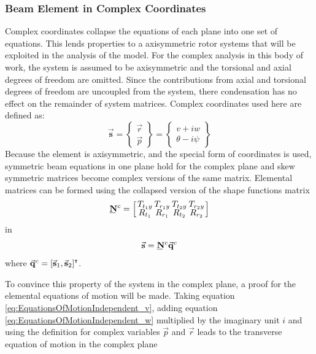 \subsubsection{Beam Element in Complex Coordinates} \label{Beam Element in Complex Coordinates}
Complex coordinates collapse the equations of each plane into one set of equations. This lends properties to a axisymmetric rotor systems that will be exploited in the analysis of the model. For the complex analysis in this body of work, the system is assumed to be axisymmetric and the torsional and axial degrees of freedom are omitted. Since the contributions from axial and torsional degrees of freedom are uncoupled from the system, there condensation has no effect on the remainder of system matrices. Complex coordinates used here are defined as:
\begin{equation}\label{eq:ComplexCoordinates}
\vec{\mathbf{s}}=\left\{\begin{array}{c}
\vec{r}\\
\vec{p}
\end{array}\right\}=\left\{\begin{array}{c}
v+iw\\
\theta-i\psi\end{array}\right\}
\end{equation}
Because the element is axisymmetric, and the special form of coordinates is used, symmetric beam equations in one plane hold for the complex plane and skew symmetric matrices become complex versions of the same matrix. Elemental matrices can be formed using the collapsed version of the shape functions matrix
\begin{equation}\label{ShapeFunctionMatrixComplex}
\def\cs{2em}
\bunderline{\mathbf{N}}^c=\left[\def\arraystretch{.8}\arraycolsep=0em\begin{array}{cccc}
\makebox[\cs]{$T_{t_1y}$}&\makebox[\cs]{$T_{r_1y}$}&\makebox[\cs]{$T_{t_2y}$}&\makebox[\cs]{$T_{r_2y}$}\\
R_{t_1}&R_{r_1}&R_{t_2}&R_{r_2}
\end{array}\right]
\end{equation}
in 
\begin{equation}\label{eq:FEGoverningComplex}
\vec{\mathbf{s}}=\bunderline{\mathbf{N}}^c\vec{\mathbf{q}}^c
\end{equation}
where $ \vec{\mathbf{q}}^c=[\vec{\mathbf{s}}_1,\vec{\mathbf{s}}_2]^{\textbf{{\tiny \textsf{T}}}} $.\par 
To convince this property of the system in the complex plane, a proof for the elemental equations of motion will be made. Taking equation \eqref{eq:EquationsOfMotionIndependent_v}, adding equation \eqref{eq:EquationsOfMotionIndependent_w} multiplied by the imaginary unit $ i $ and using the definition for complex variables $ \vec{p} $ and $ \vec{r} $ leads to the transverse equation of motion in the complex plane
